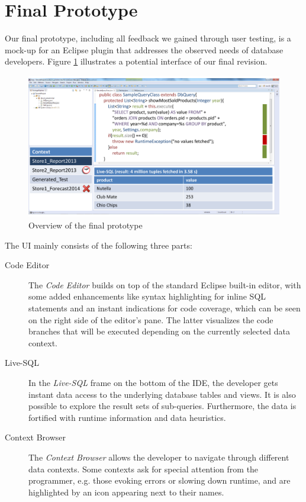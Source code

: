 
\section{Final Prototype}
\label{sec:FINAL_PROTOTYPE}
Our final prototype, including all feedback we gained through user testing, is a mock-up for an Eclipse plugin that addresses the observed needs of database developers. Figure \ref{fig:final_prototype_overview} illustrates a potential interface of our final revision.
\begin{figure}
\begin{centering}
    \includegraphics[width=1.0\linewidth]{images/final_prototype}
    \caption{Overview of the final prototype}
    \label{fig:final_prototype_overview}
\end{centering}
\end{figure}
The UI mainly consists of the following three parts:
\begin{description}
	\item [Code Editor] The \emph{Code Editor} builds on top of the standard Eclipse built-in editor, with some added enhancements like syntax highlighting for inline SQL statements and an instant indications for code coverage, which can be seen on the right side of the editor's pane. The latter visualizes the code branches that will be executed depending on the currently selected data context.
	\item [Live-SQL] In the \emph{Live-SQL} frame on the bottom of the IDE, the developer gets instant data access to the underlying database tables and views. It is also possible to explore the result sets of sub-queries. Furthermore, the data is fortified with runtime information and data heuristics. %
	\item [Context Browser] The \emph{Context Browser} allows the developer to navigate through different data contexts. Some contexts ask for special attention from the programmer, e.g. those evoking errors or slowing down runtime, and are highlighted by an icon appearing next to their names. %
\end{description}
